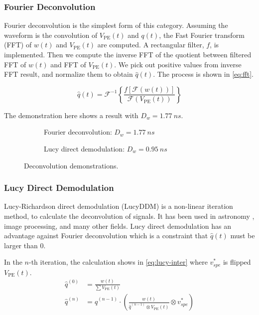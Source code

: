 \subsubsection{Fourier Deconvolution}

Fourier deconvolution is the simplest form of this category.  Assuming the waveform is the convolution of $V_\mathrm{PE}(t)$ and $q(t)$, the Fast Fourier transform (FFT) of $w(t)$ and $V_\mathrm{PE}(t)$ are computed. A rectangular filter, $f$, is implemented. Then we compute the inverse FFT of the quotient between filtered FFT of $w(t)$ and FFT of $V_\mathrm{PE}(t)$. We pick out positive values from inverse FFT result, and normalize them to obtain $\hat{q}(t)$. The process is shown in \eqref{eq:fft}. 

\begin{equation}
    \hat{q}(t) = \mathcal{F}^{-1}\left\{\frac{f[\mathcal{F}(w(t))]}{\mathcal{F}(V_\mathrm{PE}(t))}\right\}
    \label{eq:fft}
\end{equation}

The demonstration here shows a result with $D_w = \SI{1.77}{ns}$. 

\begin{figure}[H]
  \begin{subfigure}{0.5\textwidth}
    \centering
    \scalebox{0.36}{}
    \caption{Fourier deconvolution: $D_w = \SI{1.77}{ns}$}
  \end{subfigure}
  \begin{subfigure}{0.5\textwidth}
    \centering
    \scalebox{0.36}{}
    \caption{Lucy direct demodulation: $D_w = \SI{0.95}{ns}$}
  \end{subfigure}
  \caption{Deconvolution demonstrations.}
\end{figure}


\subsubsection{Lucy Direct Demodulation}

Lucy-Richardson direct demodulation (LucyDDM) is a non-linear iteration method, to calculate the deconvolution of signals. It has been used in astronomy \cite{li_richardson-lucy_2019}, image processing, and many other fields. Lucy direct demodulation has an advantage against Fourier deconvolution which is a constraint that $\hat{q}(t)$ must be larger than 0. 

In the $n$-th iteration, the calculation shows in \eqref{eq:lucy-inter} where $v^{*}_{spe}$ is flipped $V_\mathrm{PE}(t)$. 
\begin{align}
    \hat{q}^{(0)} &= \frac{w(t)}{\sum V_\mathrm{PE}(t)} \\
    \hat{q}^{(n)} &= \hat{q}^{(n-1)} \cdot \left(\frac{w(t)}{\hat{q}^{(n-1)} \otimes V_\mathrm{PE}(t)} \otimes v^{*}_{spe}\right) \label{eq:lucy-inter}
\end{align}

